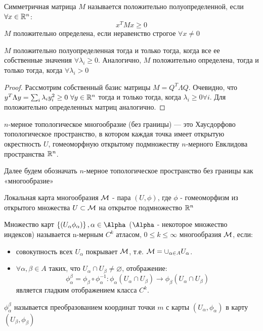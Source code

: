 \begin{definition}
Симметричная матрица $M$ называется положительно полуопределенной, если $\forall x \in \mathbb{R}^n$:
$$ x^T M x \geq 0 $$
$M$ положительно определена, если неравенство строгое $\forall x \neq 0$
\end{definition}

\begin{lemma}
$M$ положительно полуопределенная тогда и только тогда, когда все ее собственные значения $ \forall \lambda_i \geq 0$. Аналогично, $M$ положительно определена, тогда и только тогда, когда $\forall \lambda_i > 0$
\end{lemma}
\begin{proof}
Рассмотрим собственный базис матрицы $M=Q^T \Lambda Q$. Очевидно, что $y^T \Lambda y = \sum_{i} \lambda_i y_i^2 \geq 0 \ \forall y \in \mathbb{R}^n$ тогда и только тогда, когда $\lambda_i \geq 0 \forall i$. Для положительно определенных матриц аналогично.
\end{proof}

\begin{definition}
$n$-мерное топологическое многообразие (без границы) — это Хаусдорфово топологическое пространство, в котором каждая точка имеет открытую окрестность $U$, гомеоморфную открытому подмножеству $n$-мерного Евклидова пространства $\mathbb{R}^n$.
\end{definition}
Далее будем обозначать $n$-мерное топологическое пространство без границы как «многообразие»
\begin{definition}
Локальная карта многообразия $\mathcal{M}$ - пара $(U, \phi)$, где $\phi$ - гомеоморфизм из открытого множества $U \subset \mathcal{M}$ на открытое подмножество $\mathbb{R}^n$
\end{definition}

\begin{definition}
Множество карт $\set{(U_\alpha \phi_\alpha)}, \alpha \in \Alpha$ ($\Alpha$ - некоторое множество индексов) называется n-мерным $C^k$ атласом, $0 \leq k \leq \infty$ многообразия $\mathcal{M}$, если:
\begin{itemize}
    \item совокупность всех $U_\alpha$ покрывает $\mathcal{M}$, т.е. $\mathcal{M}=\cup _{{\alpha \in A}}U_{\alpha}$.
    \item $ \forall \alpha ,\beta \in A$ таких, что $U_{\alpha }\cap U_{\beta }\neq \varnothing $, отображение:
    $$\phi _{{\alpha }}^{{\beta }}=\phi _{\beta }\circ \phi _{\alpha }^{{-1}}:\phi _{\alpha }(U_{\alpha }\cap U_{\beta })\to \phi _{\beta }(U_{\alpha }\cap U_{\beta })$$
    является гладким отображением класса $C^k$.
\end{itemize}
$ {\displaystyle \phi _{\alpha }^{\beta }}$ называется преобразованием координат точки $m$ с карты  ${\displaystyle (U_{\alpha },\phi _{\alpha })}$ в карту $(U_{\beta },\phi _{\beta })$
\end{definition}

